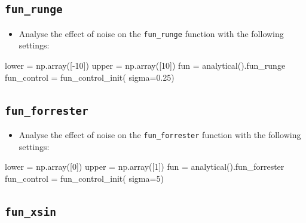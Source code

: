 \documentclass[
  letterpaper,
  DIV=11,
  numbers=noendperiod]{scrreprt}
\newenvironment{Shaded}{\begin{snugshade}}{\end{snugshade}}
\newcommand{\DecValTok}[1]{\textcolor[rgb]{0.68,0.00,0.00}{#1}}
\newcommand{\FloatTok}[1]{\textcolor[rgb]{0.68,0.00,0.00}{#1}}
\newcommand{\NormalTok}[1]{\textcolor[rgb]{0.00,0.23,0.31}{#1}}
\newcommand{\OperatorTok}[1]{\textcolor[rgb]{0.37,0.37,0.37}{#1}}
\providecommand{\tightlist}{%
  \setlength{\itemsep}{0pt}\setlength{\parskip}{0pt}}\usepackage{longtable,booktabs,array}
\begin{document}
\subsection{\texorpdfstring{\texttt{fun\_runge}}{fun\_runge}}\label{fun_runge-1}

\begin{itemize}
\tightlist
\item
  Analyse the effect of noise on the \texttt{fun\_runge} function with
  the following settings:
\end{itemize}

\begin{Shaded}
\begin{Highlighting}[]
\NormalTok{lower }\OperatorTok{=}\NormalTok{ np.array([}\OperatorTok{{-}}\DecValTok{10}\NormalTok{])}
\NormalTok{upper }\OperatorTok{=}\NormalTok{ np.array([}\DecValTok{10}\NormalTok{])}
\NormalTok{fun }\OperatorTok{=}\NormalTok{ analytical().fun\_runge}
\NormalTok{fun\_control }\OperatorTok{=}\NormalTok{ fun\_control\_init(}
\NormalTok{    sigma}\OperatorTok{=}\FloatTok{0.25}\NormalTok{)}
\end{Highlighting}
\end{Shaded}

\subsection{\texorpdfstring{\texttt{fun\_forrester}}{fun\_forrester}}\label{fun_forrester}

\begin{itemize}
\tightlist
\item
  Analyse the effect of noise on the \texttt{fun\_forrester} function
  with the following settings:
\end{itemize}

\begin{Shaded}
\begin{Highlighting}[]
\NormalTok{lower }\OperatorTok{=}\NormalTok{ np.array([}\DecValTok{0}\NormalTok{])}
\NormalTok{upper }\OperatorTok{=}\NormalTok{ np.array([}\DecValTok{1}\NormalTok{])}
\NormalTok{fun }\OperatorTok{=}\NormalTok{ analytical().fun\_forrester}
\NormalTok{fun\_control }\OperatorTok{=}\NormalTok{ fun\_control\_init(}
\NormalTok{    sigma}\OperatorTok{=}\DecValTok{5}\NormalTok{)}
\end{Highlighting}
\end{Shaded}

\subsection{\texorpdfstring{\texttt{fun\_xsin}}{fun\_xsin}}\label{fun_xsin}
\end{document}
